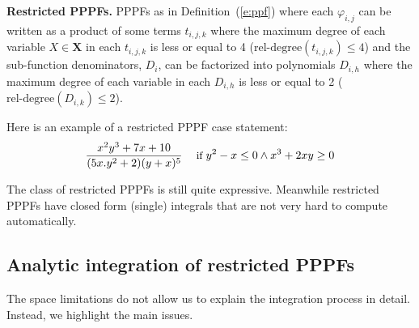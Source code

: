 \documentclass{article}
\renewcommand{\vec}[1]{\mathbf{#1}}
\newcommand{\bvec}[1]{\textbf{#1}}
\newcommand{\singlecase}[2]{#2 \quad \text{ if } #1}
\begin{document}
\textbf{Restricted PPPFs. }
PPPFs as in Definition~(\ref{e:ppf}) where 
each $\varphi_{i,j}$
can be written as a product of some terms $t_{i,j,k}$ where the maximum degree of each variable $X \in \bvec{X}$ in each $t_{i,j,k}$ is less or equal to 4 ($\text{rel-degree}(t_{i,j,k}) \leq 4$)
and the sub-function denominators, $D_{i}$, can be factorized into polynomials ${D}_{i,h}$ where the maximum degree of each variable in each $D_{i,h}$ is less or equal to 2 ($\text{rel-degree}(D_{i, k}) \leq 2$).%

Here is an example of a restricted PPPF case statement:
\begin{equation*}
{\footnotesize
\singlecase{y^2-x\leq 0 \wedge x^3+2xy \geq 0}{\frac{x^2 y^3 + 7x + 10}{(5x.y^2 + 2)(y + x)^5}}
}
\end{equation*}

The class of restricted PPPFs is still quite expressive. Meanwhile restricted PPPFs have closed form (single) integrals that are not very hard to compute automatically. 

\subsection{Analytic integration of restricted PPPFs}
The space limitations do not allow us to explain the integration process in detail. 
Instead, we highlight the main issues.
\end{document}
